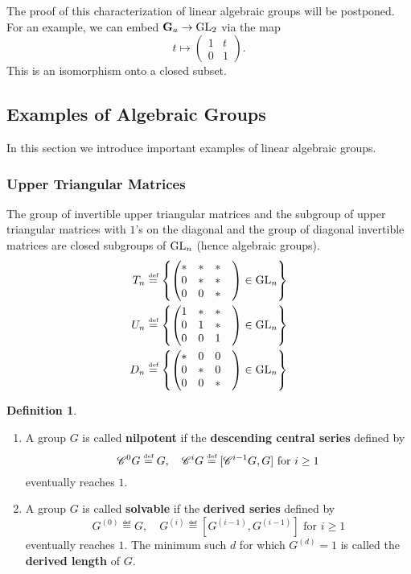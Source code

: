 \documentclass[]{pcmi}
\theoremstyle{plain}
\theoremstyle{definition}
\newtheorem{Definition}[equation]{Definition}
\begin{document}
The proof of this characterization of linear algebraic groups will be postponed. For an example, we can embed $\mathbf{G}_a \to \operatorname{GL}_2$ via the map 
\[
    t \mapsto \begin{pmatrix} 1 & t \\ 0 & 1 \end{pmatrix}. 
\]
This is an isomorphism onto a closed subset. 

\subsection{Examples of Algebraic Groups}

In this section we introduce important examples of linear algebraic groups. 

\subsubsection{Upper Triangular Matrices}

The group of invertible upper triangular matrices and the subgroup of upper triangular matrices with $1$'s on the diagonal and the group of diagonal invertible matrices are closed subgroups of $\operatorname{GL}_n$ (hence algebraic groups). 
\begin{align*}
    T_n & \overset{\textup{\tiny def}}= \left \{ \begin{pmatrix} * & * & * \\ 0 & * & * & \\ 0 & 0 & * \end{pmatrix} \in \operatorname{GL}_n \right \} \\
    U_n & \overset{\textup{\tiny def}}= \left \{ \begin{pmatrix} 1 & * & * \\ 0 & 1 & * & \\ 0 & 0 & 1 \end{pmatrix} \in \operatorname{GL}_n \right \} \\
    D_n & \overset{\textup{\tiny def}}= \left \{ \begin{pmatrix} * & 0 & 0 \\ 0 & * & 0 & \\ 0 & 0 & * \end{pmatrix} \in \operatorname{GL}_n \right \} \\
\end{align*}

\begin{Definition}
    \phantom{h}
    \begin{enumerate}
    \item A group $G$ is called \textbf{nilpotent} if the \textbf{descending central series} defined by 
    \[
        \mathscr{C}^0 G \overset{\textup{\tiny def}}= G, \quad \mathscr{C}^i G \overset{\textup{\tiny def}}= [\mathscr{C}^{i-1}G, G] \text{ for } i \geq 1
    \]
    eventually reaches $1$. 
    \item A group $G$ is called \textbf{solvable} if the \textbf{derived series} defined by 
    \[
        G^{(0)} \eqdef G, \quad G^{(i)} \eqdef [G^{(i-1)}, G^{(i-1)}] \text{ for } i \geq 1 
    \]
    eventually reaches $1$. The minimum such $d$ for which $G^{(d)} = 1$ is called the \textbf{derived length} of $G$. 
    \end{enumerate}
\end{Definition}
\end{document}
